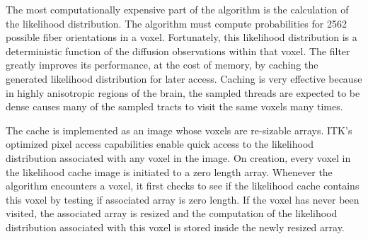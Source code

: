 The most computationally expensive part of the algorithm is the calculation of the likelihood distribution.  The algorithm must compute probabilities for 2562 possible fiber orientations in a voxel.  Fortunately, this likelihood distribution is a deterministic function of the diffusion observations within that voxel.  The filter greatly improves its performance, at the cost of memory, by caching the generated likelihood distribution for later access.  Caching is very effective because in highly anisotropic regions of the brain, the sampled threads are expected to be dense causes many of the sampled tracts to visit the same voxels many times.

The cache is implemented as an image whose voxels are re-sizable arrays.  ITK's optimized pixel access capabilities enable quick access to the likelihood distribution associated with any voxel in the image.  On creation, every voxel in the likelihood cache image is initiated to a zero length array.  Whenever the algorithm encounters a voxel, it first checks to see if the likelihood cache contains this voxel by testing if associated array is zero length.  If the voxel has never been visited, the associated array is resized and the computation of the likelihood distribution associated with this voxel is stored inside the newly resized array.

